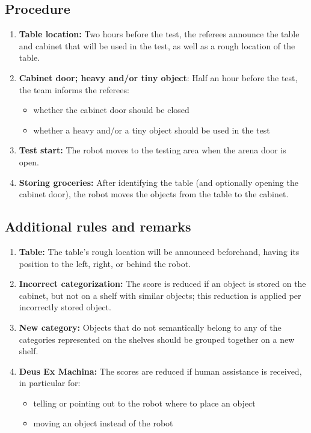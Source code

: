 \subsection*{Procedure}
\begin{enumerate}[nosep]
	\item \textbf{Table location:} Two hours before the test, the referees announce the table and cabinet that will be used in the test, as well as a rough location of the table.
	\item \textbf{Cabinet door; heavy and/or tiny object}: Half an hour before the test, the team informs the referees:
		\begin{itemize}
			\item whether the cabinet door should be closed
			\item whether a heavy and/or a tiny object should be used in the test
		\end{itemize}
	\item \textbf{Test start:} The robot moves to the testing area when the arena door is open.
	\item \textbf{Storing groceries:} After identifying the table (and optionally opening the cabinet door), the robot moves the objects from the table to the cabinet.
\end{enumerate}


\subsection*{Additional rules and remarks}
\begin{enumerate}
	\item \textbf{Table:} The table's rough location will be announced beforehand, having its position to the left, right, or behind the robot.
	\item \textbf{Incorrect categorization:} The score is reduced if an object is stored on the cabinet, but not on a shelf with similar objects; this reduction is applied per incorrectly stored object.
	\item \textbf{New category:} Objects that do not semantically belong to any of the categories represented on the shelves should be grouped together on a new shelf.
	\item \textbf{Deus Ex Machina:} The scores are reduced if human assistance is received, in particular for:
	\begin{itemize}
		\item telling or pointing out to the robot where to place an object
		\item moving an object instead of the robot
	\end{itemize}
\end{enumerate}

